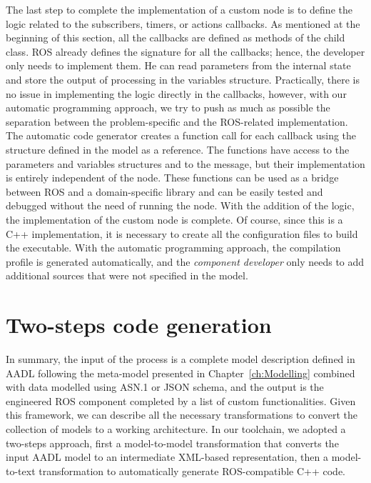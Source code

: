 The last step to complete the implementation of a custom node is to define the logic related to the subscribers, timers, or actions callbacks. As mentioned at the beginning of this section, all the callbacks are defined as methods of the child class. ROS already defines the signature for all the callbacks; hence, the developer only needs to implement them. He can read parameters from the internal state and store the output of processing in the variables structure. Practically, there is no issue in implementing the logic directly in the callbacks, however, with our automatic programming approach, we try to push as much as possible the separation between the problem-specific and the ROS-related implementation. The automatic code generator creates a function call for each callback using the structure defined in the model as a reference. The functions have access to the parameters and variables structures and to the message, but their implementation is entirely independent of the node. These functions can be used as a bridge between ROS and a domain-specific library and can be easily tested and debugged without the need of running the node. With the addition of the logic, the implementation of the custom node is complete. Of course, since this is a C++ implementation, it is necessary to create all the configuration files to build the executable. With the automatic programming approach, the compilation profile is generated automatically, and the \textit{component developer} only needs to add additional sources that were not specified in the model.

\section{Two-steps code generation}
In summary, the input of the process is a complete model description defined in AADL following the meta-model presented in Chapter~\ref{ch:Modelling} combined with data modelled using ASN.1 or JSON schema, and the output is the engineered ROS component completed by a list of custom functionalities. Given this framework, we can describe all the necessary transformations to convert the collection of models to a working architecture. In our toolchain, we adopted a two-steps approach, first a model-to-model transformation that converts the input AADL model to an intermediate XML-based representation, then a model-to-text transformation to automatically generate ROS-compatible C++ code.

